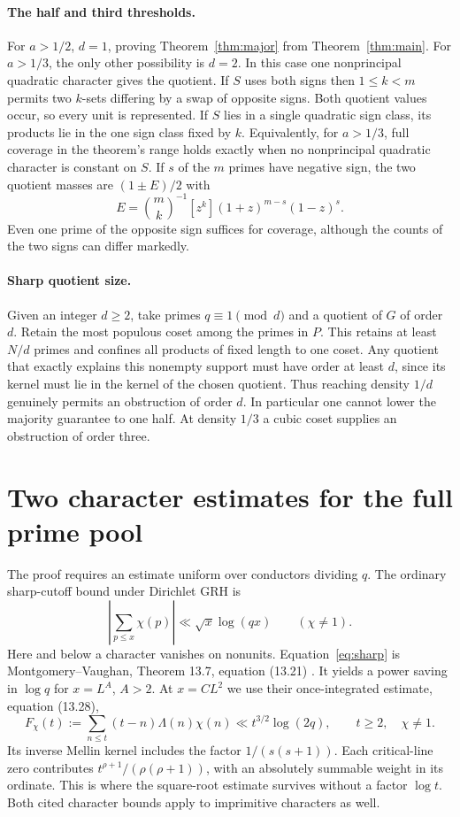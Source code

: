\documentclass[11pt]{article}
\begin{document}
\paragraph{The half and third thresholds.}
For $a>1/2$, $d=1$, proving Theorem~\ref{thm:major} from
Theorem~\ref{thm:main}. For $a>1/3$, the only other possibility is $d=2$.
In this case one nonprincipal quadratic character gives the quotient. If $S$
uses both signs then $1\le k<m$ permits two $k$-sets differing by a swap of
opposite signs. Both quotient values occur, so every unit is represented.
If $S$ lies in a single quadratic sign class, its products lie in the one sign
class fixed by $k$. Equivalently, for $a>1/3$, full coverage in the theorem's
range holds exactly when no nonprincipal quadratic character is constant on
$S$. If $s$ of the $m$ primes have negative sign, the two quotient masses are
$(1\pm E)/2$ with
\[
 E=\binom mk^{-1}[z^k](1+z)^{m-s}(1-z)^s.
\]
Even one prime of the opposite sign suffices for coverage, although the
counts of the two signs can differ markedly.

\paragraph{Sharp quotient size.}
Given an integer $d\ge2$, take primes $q\equiv1\pmod d$ and a quotient of
$G$ of order $d$. Retain the most populous coset among the primes in $P$.
This retains at least $N/d$ primes and confines all products of fixed length
to one coset. Any quotient that exactly explains this nonempty support must
have order at least $d$, since its kernel must lie in the kernel of the chosen
quotient. Thus reaching density $1/d$ genuinely permits an obstruction of
order $d$. In particular one cannot lower the majority guarantee to one
half. At density $1/3$ a cubic coset supplies an obstruction of order three.

\section{Two character estimates for the full prime pool}
The proof requires an estimate uniform over conductors dividing $q$. The
ordinary sharp-cutoff bound under Dirichlet GRH is
\begin{equation}\label{eq:sharp}
 \left|\sum_{p\le x}\chi(p)\right|\ll \sqrt x\log(qx)
 \qquad(\chi\ne1).
\end{equation}
Here and below a character vanishes on nonunits. Equation~\eqref{eq:sharp}
is Montgomery--Vaughan, Theorem 13.7, equation (13.21) \cite{mv}. It yields
a power saving in $\log q$ for $x=L^A$, $A>2$. At $x=CL^2$ we use their
once-integrated estimate, equation (13.28),
\begin{equation}\label{eq:tri}
 F_\chi(t):=\sum_{n\le t}(t-n)\Lambda(n)\chi(n)
 \ll t^{3/2}\log(2q),\qquad t\ge2,\quad\chi\ne1 .
\end{equation}
Its inverse Mellin kernel includes the factor $1/(s(s+1))$. Each critical-line
zero contributes $t^{\rho+1}/(\rho(\rho+1))$, with an absolutely summable
weight in its ordinate. This is where the square-root estimate survives
without a factor $\log t$. Both cited character bounds apply to imprimitive
characters as well.
\end{document}
